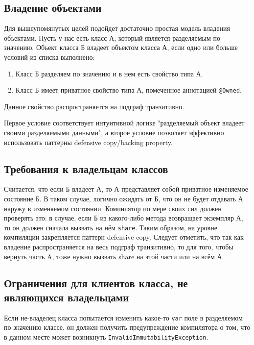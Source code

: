 \documentclass[specification,annotation,times]{itmo-student-thesis}
\begin{document}
\subsection{Владение объектами}

Для вышеупомянутых целей подойдет достаточно простая модель владения объектами. Пусть у нас есть класс А, который является разделяемым по значению.
Объект класса Б владеет объектом класса А, если одно или больше условий из списка выполнено:

\begin{enumerate}
	\item Класс Б разделяем по значению и в нем есть свойство типа А. %
	\item Класс Б имеет приватное свойство типа А, помеченное аннотацией \texttt{@Owned}.
\end{enumerate}

Данное свойство распространяется на подграф транзитивно.

Первое условие соответствует интуитивной логике "разделяемый объект владеет своими разделяемыми данными", а второе условие позволяет эффективно использовать паттерны defensive copy/backing property.

\subsection{Требования к владельцам классов}

Считается, что если Б владеет А, то А представляет собой приватное изменяемое состояние Б.
В таком случае, логично ожидать от Б, что он не будет отдавать А наружу в изменяемом состоянии.
Компилятор по мере своих сил должен проверять это: в случае, если Б из какого-либо метода возвращает экземпляр А, то он должен сначала вызвать на нём \texttt{share}.
Таким образом, на уровне компиляции закрепляется паттерн defensive copy.
Следует отметить, что так как владение распространяется на весь подграф транзитивно, то для того, чтобы вернуть часть A, тоже нужно вызвать share на этой части или на всём А.

\subsection{Ограничения для клиентов класса, не являющихся владельцами}

Если не-владелец класса попытается изменить какое-то \texttt{var} поле в разделяемом по значению классе, он должен получить предупреждение компилятора о том, что в данном месте может возникнуть \texttt{InvalidImmutabilityException}.
\end{document}
